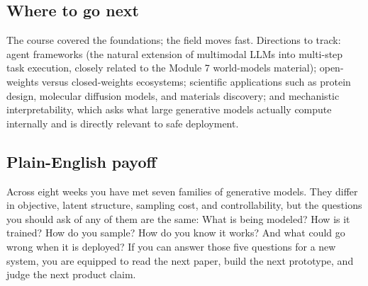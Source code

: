 \documentclass[11pt]{article}
\theoremstyle{remark}
\begin{document}
\subsection{Where to go next}
The course covered the foundations; the field moves fast. Directions to track: agent frameworks (the natural extension of multimodal LLMs into multi-step task execution, closely related to the Module 7 world-models material); open-weights versus closed-weights ecosystems; scientific applications such as protein design, molecular diffusion models, and materials discovery; and mechanistic interpretability, which asks what large generative models actually compute internally and is directly relevant to safe deployment.

\subsection*{Plain-English payoff}
Across eight weeks you have met seven families of generative models. They differ in objective, latent structure, sampling cost, and controllability, but the questions you should ask of any of them are the same: What is being modeled? How is it trained? How do you sample? How do you know it works? And what could go wrong when it is deployed? If you can answer those five questions for a new system, you are equipped to read the next paper, build the next prototype, and judge the next product claim.

\end{document}
